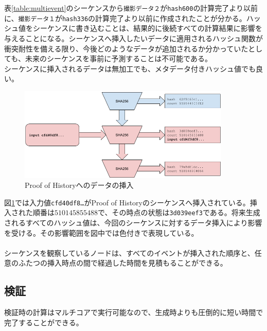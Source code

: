 \documentclass[12pt]{ltjsarticle}
\begin{document}
表\ref{table:multievent}のシーケンスから\texttt{撮影データ２}が\texttt{hash600}の計算完了より以前に、\texttt{撮影データ１}が\texttt{hash336}の計算完了より以前に作成されたことが分かる。ハッシュ値をシーケンスに書き込むことは、結果的に後続すべての計算結果に影響を与えることになる。シーケンスへ挿入したいデータに適用されるハッシュ関数が衝突耐性を備える限り、今後どのようなデータが追加されるか分かっていたとしても、未来のシーケンスを事前に予測することは不可能である。\\

シーケンスに挿入されるデータは無加工でも、メタデータ付きハッシュ値でも良い。\\

\begin{figure}[h]
  \begin{center}
    \centering
    \includegraphics[width=0.9\textwidth]{../../figures/fig_3.png}
    \caption[Fig 3]{Proof of Historyへのデータの挿入\label{fig:poh_insert}}
  \end{center}
  \end{figure}

  図\ref{fig:poh_insert}では入力値\texttt{cfd40df8\ldots}がProof of Historyのシーケンスへ挿入されている。挿入された順番は$510145855488$で、その時点の状態は\texttt{3d039eef3}である。将来生成されるすべてのハッシュ値は、今回のシーケンスに対するデータ挿入により影響を受ける。その影響範囲を図中では色付きで表現している。\\\\

シーケンスを観察しているノードは、すべてのイベントが挿入された順序と、任意のふたつの挿入時点の間で経過した時間を見積もることができる。

\subsection{検証}\label{poh:verify}
検証時の計算はマルチコアで実行可能なので、生成時よりも圧倒的に短い時間で完了することができる。\\
\end{document}
